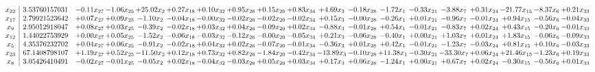\documentclass[9pt]{article}
\begin{document}
 \[\begin{array}{c| c c@{\hskip 2pt} c@{\hskip 2pt} c@{\hskip 2pt} c@{\hskip 2pt} c@{\hskip 2pt} c@{\hskip 2pt} c@{\hskip 2pt} c@{\hskip 2pt} c@{\hskip 2pt} c@{\hskip 2pt} c@{\hskip 2pt} c@{\hskip 2pt} c@{\hskip 2pt} c@{\hskip 2pt} c@{\hskip 2pt} c@{\hskip 2pt} c@{\hskip 2pt} }
 x_{22}   &  3.53760157031 & -0.11 x_{27} & -1.06 x_{25} & + 25.02 x_{2} & +  0.27 x_{18} & +  0.10 x_{32} & +  0.95 x_{26} & +  0.15 x_{20} & +  0.83 x_{34} & +  4.69 x_{3} & -0.18 x_{28} & -1.72 x_{1} & -0.33 x_{21} & -3.88 x_{7} & +  0.31 x_{24} & -21.77 x_{15} & -8.37 x_{6} & +  0.21 x_{33}\\
 x_{17}   &  2.79921523642 & +  0.07 x_{27} & +  0.09 x_{25} & -1.10 x_{2} & -0.04 x_{18} & -0.00 x_{32} & -0.02 x_{26} & -0.02 x_{20} & -0.02 x_{34} & +  0.15 x_{3} & -0.00 x_{28} & -0.26 x_{1} & +  0.01 x_{21} & -0.96 x_{7} & -0.01 x_{24} & +  0.94 x_{15} & -0.56 x_{6} & -0.04 x_{33}\\
 x_{9}   &  2.95012918047 & +  0.08 x_{27} & +  0.03 x_{25} & -0.39 x_{2} & -0.02 x_{18} & +  0.03 x_{32} & +  0.04 x_{26} & -0.09 x_{20} & +  0.02 x_{34} & -0.88 x_{3} & -0.01 x_{28} & +  0.54 x_{1} & -0.01 x_{21} & -0.83 x_{7} & +  0.02 x_{24} & +  0.43 x_{15} & -0.20 x_{6} & -0.01 x_{33}\\
 x_{12}   &  1.44022753929 & +  0.00 x_{27} & +  0.05 x_{25} & -1.52 x_{2} & -0.06 x_{18} & -0.03 x_{32} & -0.12 x_{26} & -0.00 x_{20} & -0.05 x_{34} & +  0.21 x_{3} & -0.06 x_{28} & -0.40 x_{1} & +  0.00 x_{21} & +  1.03 x_{7} & +  0.01 x_{24} & +  1.83 x_{15} & -0.06 x_{6} & -0.09 x_{33}\\
 x_{5}   &  4.35376232702 & +  0.04 x_{27} & +  0.06 x_{25} & -0.91 x_{2} & -0.02 x_{18} & +  0.04 x_{32} & +  0.02 x_{26} & -0.07 x_{20} & -0.01 x_{34} & -0.36 x_{3} & +  0.01 x_{28} & +  0.42 x_{1} & -0.01 x_{21} & -1.23 x_{7} & -0.03 x_{24} & +  0.81 x_{15} & +  0.10 x_{6} & -0.03 x_{33}\\
 x_{23}   &  67.1408798107 & +  1.19 x_{27} & +  0.52 x_{25} & -11.50 x_{2} & +  0.12 x_{18} & +  0.73 x_{32} & +  0.82 x_{26} & -1.84 x_{20} & -0.42 x_{34} & -13.89 x_{3} & -0.10 x_{28} & + 11.38 x_{1} & -0.30 x_{21} & -33.30 x_{7} & +  0.06 x_{24} & + 21.46 x_{15} & -1.23 x_{6} & +  0.19 x_{33}\\
 x_{8}   &  3.05426410491 & -0.02 x_{27} & -0.01 x_{25} & -0.05 x_{2} & +  0.02 x_{18} & -0.04 x_{32} & -0.03 x_{26} & +  0.05 x_{20} & +  0.03 x_{34} & +  0.17 x_{3} & +  0.06 x_{28} & -1.24 x_{1} & +  0.00 x_{21} & +  0.67 x_{7} & +  0.02 x_{24} & -0.30 x_{15} & -0.56 x_{6} & +  0.01 x_{33}\\

\end{array}\]
\end{document}
